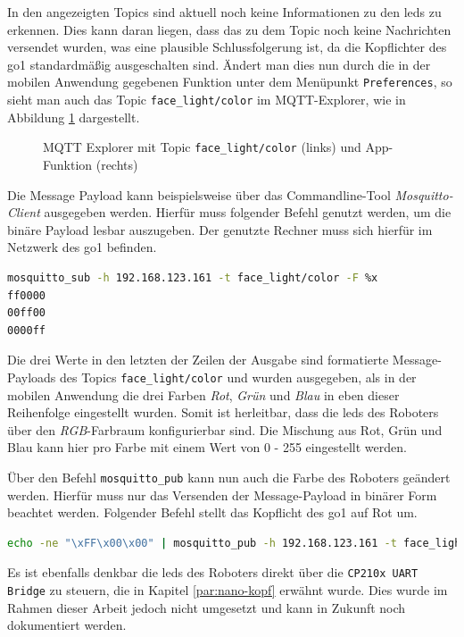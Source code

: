In den angezeigten Topics sind aktuell noch keine Informationen zu den \glspl{led} zu erkennen.
Dies kann daran liegen, dass das zu dem Topic noch keine Nachrichten versendet wurden, was eine plausible Schlussfolgerung
ist, da die Kopflichter des \gls{go1} standardmäßig ausgeschalten sind.
Ändert man dies nun durch die in der mobilen Anwendung gegebenen Funktion unter dem Menüpunkt \texttt{Preferences}, so
sieht man auch das Topic \texttt{face\_light/color} im MQTT-Explorer, wie in Abbildung \ref{fig:app-mqtt-facelight} dargestellt.

\begin{figure}[h]
    \caption{MQTT Explorer mit Topic \texttt{face\_light/color} (links) und App-Funktion (rechts)}\label{fig:app-mqtt-facelight}
\end{figure}

Die Message Payload kann beispielsweise über das Commandline-Tool \emph{Mosquitto-Client} ausgegeben werden.
Hierfür muss folgender Befehl genutzt werden, um die binäre Payload lesbar auszugeben.
Der genutzte Rechner muss sich hierfür im Netzwerk des \gls{go1} befinden.

\begin{lstlisting}[language=Bash]
mosquitto_sub -h 192.168.123.161 -t face_light/color -F %x
ff0000
00ff00
0000ff
\end{lstlisting}

\noindent Die drei Werte in den letzten der Zeilen der Ausgabe sind formatierte Message-Payloads des Topics \texttt{face\_light/color}
und wurden ausgegeben, als in der mobilen Anwendung die drei Farben \emph{Rot}, \emph{Grün} und \emph{Blau} in eben dieser
Reihenfolge eingestellt wurden.
Somit ist herleitbar, dass die \glspl{led} des Roboters über den \emph{RGB}-Farbraum konfigurierbar sind.
Die Mischung aus Rot, Grün und Blau kann hier pro Farbe mit einem Wert von \num{0} - \num{255} eingestellt werden.

Über den Befehl \texttt{mosquitto\_pub} kann nun auch die Farbe des Roboters geändert werden.
Hierfür muss nur das Versenden der Message-Payload in binärer Form beachtet werden.
Folgender Befehl stellt das Kopflicht des \gls{go1} auf Rot um.

\begin{lstlisting}[language=Bash]
echo -ne "\xFF\x00\x00" | mosquitto_pub -h 192.168.123.161 -t face_light/color -s
\end{lstlisting}

\noindent Es ist ebenfalls denkbar die \glspl{led} des Roboters direkt über die \texttt{CP210x UART Bridge} zu steuern, die in Kapitel
\ref{par:nano-kopf} erwähnt wurde.
Dies wurde im Rahmen dieser Arbeit jedoch nicht umgesetzt und kann in Zukunft noch dokumentiert werden.
